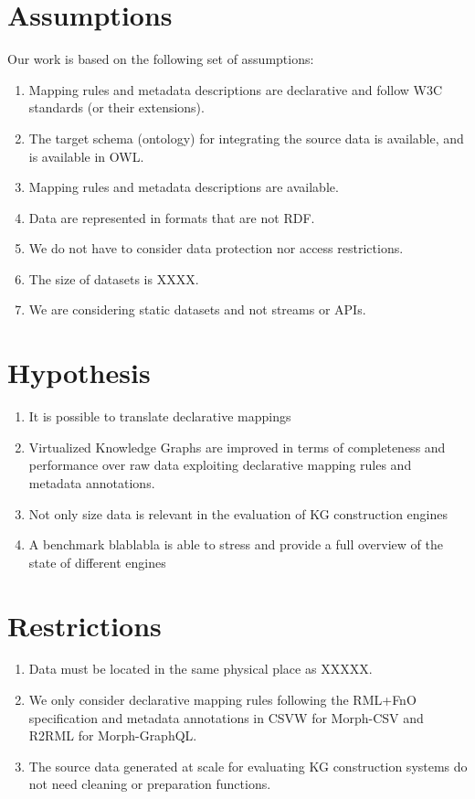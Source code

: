 \section{Assumptions}
Our work is based on the following set of assumptions:
\begin{enumerate}[label=\textbf{A{\arabic*}}]
    \item Mapping rules and metadata descriptions are declarative and follow W3C standards (or their extensions). 
    \item The target schema (ontology) for integrating the source data is available, and is available in OWL.
    \item Mapping rules and metadata descriptions are available.
    \item Data are represented in formats that are not RDF.
    \item We do not have to consider data protection nor access restrictions.
    \item The size of datasets is XXXX.
    \item We are considering static datasets and not streams or APIs.
\end{enumerate}

\section{Hypothesis}

\begin{enumerate}[label=\textbf{H{\arabic*}}]
    \item It is possible to translate declarative mappings
    \item Virtualized Knowledge Graphs are improved in terms of completeness and performance over raw data exploiting declarative mapping rules and metadata annotations.
    \item Not only size data is relevant in the evaluation of KG construction engines
    \item A benchmark blablabla is able to stress and provide a full overview of the state of different engines 
\end{enumerate}

\section{Restrictions}

\begin{enumerate}[label=\textbf{R{\arabic*}}]
    \item Data must be located in the same physical place as XXXXX.
    \item We only consider declarative mapping rules following the RML+FnO~\citep{de2017declarative} specification and metadata annotations in CSVW for Morph-CSV and R2RML for Morph-GraphQL.
    \item The source data generated at scale for evaluating KG construction systems do not need cleaning or preparation functions.
\end{enumerate}
